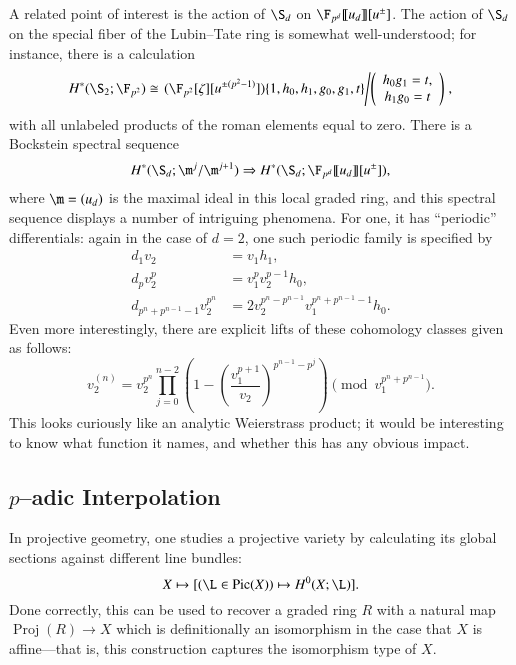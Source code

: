 A related point of interest is the action of $\S_d$ on $\F_{p^d}\ps{u_d}[u^\pm]$.  The action of $\S_d$ on the special fiber of the Lubin--Tate ring is somewhat well-understood; for instance, there is a calculation \[H^*(\S_2; \F_{p^2}) \cong \left.(\F_{p^2}[\zeta][u^{\pm(p^2-1)}])\{1, h_0, h_1, g_0, g_1, t\}\middle/\left(\begin{array}{c} h_0 g_1 = t, \\ h_1 g_0 = t \end{array}\right)\right. ,\] with all unlabeled products of the roman elements equal to zero.  There is a Bockstein spectral sequence \[H^*(\S_d; \m^j / \m^{j+1}) \Rightarrow H^*(\S_d; \F_{p^d}\ps{u_d}[u^\pm]),\] where $\m = (u_d)$ is the maximal ideal in this local graded ring, and this spectral sequence displays a number of intriguing phenomena.  For one, it has ``periodic'' differentials: again in the case of $d = 2$, one such periodic family is specified by
\begin{align*}
d_1 v_2 & = v_1 h_1, \\
d_p v_2^p & = v_1^p v_2^{p-1} h_0, \\
d_{p^n+p^{n-1}-1} v_2^{p^n} & = 2 v_2^{p^n - p^{n-1}} v_1^{p^n + p^{n-1} - 1} h_0.
\end{align*}
Even more interestingly, there are explicit lifts of these cohomology classes given as follows: \[v_2^{(n)} = v_2^{p^n} \prod_{j=0}^{n-2} \left(1 - \left( \frac{v_1^{p+1}}{v_2} \right)^{p^{n-1} - p^j} \right) \pmod{v_1^{p^n + p^{n-1}}}.\]  This looks curiously like an analytic Weierstrass product; it would be interesting to know what function it names, and whether this has any obvious impact.





\subsection*{$p$--adic Interpolation}

In projective geometry, one studies a projective variety by calculating its global sections against different line bundles: \[X \mapsto [(\L \in \Pic(X)) \mapsto H^0(X; \L)].\]  Done correctly, this can be used to recover a graded ring $R$ with a natural map $\operatorname{Proj}(R) \to X$ which is definitionally an isomorphism in the case that $X$ is affine---that is, this construction captures the isomorphism type of $X$.

